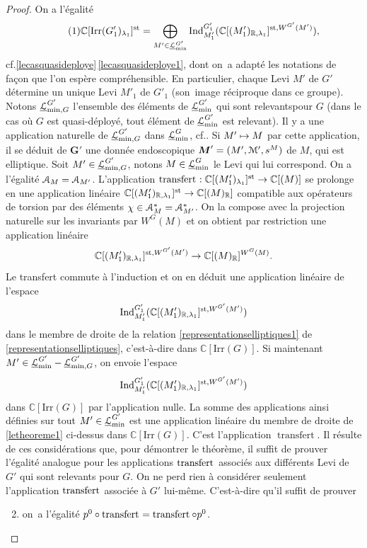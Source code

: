 \documentclass[11pt]{article}
\newcommand{\cf}{cf.\xspace}
\numberwithin{equation}{section}\providecommand{\og}{«\,}\providecommand{\fg}{\,»}
\let\mathcal \EuScript
\newcommand{\NoChangel}[1]{%
\expandafter\let\csname old\string#1\endcsname=#1
\let#1=\relax
\newcommand{#1}{\mathcode`l="716C\csname old\string#1\endcsname\mathcode`l="7160 }%
}
\newcommand\mto{\mathchoice{\longmapsto}{\mapsto}{\mapsto}{\mapsto}}
\newcommand{\rell}{\mathrm{ell}} \NoChangel{\rell}
\newcommand{\Ell}{\mathrm{Ell}} \NoChangel{\Ell}
\newcommand{\Ind}{\mathrm{Ind}}
\newcommand{\Irr}{\mathrm{Irr}}
\newcommand{\trel}{\textup{-rel}} \NoChangel{\trel}
\newcommand{\st}{\mathrm{st}}
\DeclareMathOperator{\transfert}{transfert}
\newcommand{\bG}{\boldsymbol{G}}
\newcommand{\bM}{\boldsymbol{M}}
\newcommand{\cA}{\mathcal{A}}
\newcommand{\cL}{\mathcal{L}}
\newcommand{\cM}{\mathcal{M}}
\newcommand{\CC}{\mathbb{C}}
\newcommand{\RR}{\mathbb{R}}
\theoremstyle{plain}
\theoremstyle{definition}
\begin{document}
\begin{proof}
On a l'égalité
\begin{equation}\tag{1}\label{letheoreme1}
\CC[\Irr(G'_{1})_{\lambda_{1}}]^{\st}=\bigoplus_{M'\in \underline{\cL}_{\min}^{G'}}\Ind_{M'_{1}}^{G'_{1}}(\CC[\Ell(M'_{1})_{\RR,\lambda_{1}}]^{\st,W^{G'}(M')}),
\end{equation}
\cf \ref{lecasquasideploye}\,\eqref{lecasquasideploye1}, dont on~a adapté les notations de façon que l'on espère compréhensible. En particulier, chaque Levi $M'$ de $G'$ détermine un unique Levi $M'_{1}$ de $G'_{1}$ (son~image réciproque dans ce groupe). Notons $\underline{\cL}_{\min,G\trel}^{G'}$ l'ensemble des éléments de $\underline{\cL}_{\min}^{G'}$ qui sont \og relevants\fg pour $G$ (dans le cas où $G$ est quasi-déployé, tout élément de $\underline{\cL}_{\min}^{G'}$ est relevant). Il y a une application naturelle
de $\underline{\cL}_{\min,G\trel}^{G'}$ dans $\underline{\cL} _{\min}^G$, \cf \hbox{\cite[1.3.4]{MW}}. Si $M'\mto M$ par cette application, il se déduit de $\bG'$ une donnée endoscopique $\bM'=(M',\cM',s^M)$ de $M$, qui est elliptique.
Soit $M'\in \underline{\cL}_{\min,G\trel}^{G'}$, notons $M\in \underline{\cL} _{\min}^G$ le Levi qui lui correspond. On a l'égalité $\cA_{M}=\cA_{M'}$. L'application $\transfert_{\rell}: \CC[\Ell(M'_{1})_{\lambda_{1}}]^{\st}\to \CC[\Ell(M)]$ se prolonge en une application linéaire
$\CC[\Ell(M'_{1})_{\RR,\lambda_{1}}]^{\st}\to \CC[\Ell(M)_{\RR}]$ compatible aux opérateurs de torsion par des éléments $\chi\in \cA_{M}^*=\cA_{M'}^*$. On la compose avec la projection naturelle sur les invariants par $W^G(M)$ et on obtient par restriction une application linéaire
\[
\CC[\Ell(M'_{1})_{\RR,\lambda_{1}}]^{\st,W^{G'}(M')}\to \CC[\Ell(M)_{\RR}]^{W^G(M)}.
\]
Le transfert commute à l'induction et on en déduit une application linéaire de l'espace
\[
\Ind_{M'_{1}}^{G'_{1}}(\CC[\Ell(M'_{1})_{\RR,\lambda_{1}}]^{\st,W^{G'}(M')})
\]
dans le membre de droite de la relation \eqref{representationselliptiques1} de \ref{representationselliptiques}, c'est-à-dire dans $ \CC[\Irr(G)]$. Si maintenant $M'\in \underline{\cL}_{\min}^{G'}-\underline{\cL}_{\min,G\trel}^{G'}$, on envoie l'espace
\[
\Ind_{M'_{1}}^{G'_{1}}(\CC[\Ell(M'_{1})_{\RR,\lambda_{1}}]^{\st,W^{G'}(M')})
\]
dans $ \CC[\Irr(G)]$ par l'application nulle. La somme des applications ainsi définies sur tout $M'\in \underline{\cL}_{\min}^{G'}$ est une application linéaire du membre de droite de \eqref{letheoreme1} ci-dessus dans $ \CC[\Irr(G)]$. C'est
l'application $\transfert$. Il résulte de ces considérations que, pour démontrer le théorème, il suffit de prouver l'égalité analogue pour les applications $\transfert_{\rell}$ associés aux différents Levi de $G'$ qui sont relevants pour $G$. On ne perd rien à considérer seulement l'application $\transfert_{\rell}$ associée à $G'$ lui-même. C'est-à-dire qu'il suffit de prouver
\begin{enumerate}\setcounter{enumi}{1}
\item\label{letheoreme2}
on~a l'égalité $p^0\circ \transfert_{\rell}=\transfert_{\rell}\circ p^0$.
\end{enumerate}


\end{proof}
\end{document}
